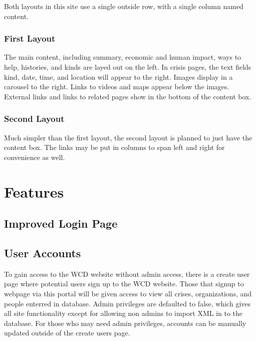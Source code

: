 \documentclass[12pt]{report}
\begin{document}
Both layouts in this site use a single outside row, with a single column named content.
\\


\subsubsection*{First Layout}
The main content, including summary, economic and human impact,
ways to help, histories, and kinds are layed out on the left.
In crisis pages, the text fields kind, date, time, and location will appear to the right.
Images display in a carousel to the right.
Links to videos and maps appear below the images.
External links and links to related pages show in the bottom of the content box.
\\


\subsubsection*{Second Layout}
Much simpler than the first layout, the second layout is planned to just have the content box.
The links may be put in columns to span left and right for convenience as well.
\\


\newpage
\section*{Features}
\hfill

\subsection*{Improved Login Page}
\hfill


\subsection*{User Accounts}
\hfill

To gain access to the WCD website without admin access, there is a create user page where potential users sign up to the WCD website. Those that signup to webpage via this portal will be given access to view all crises, organizations, and people enterred in database. Admin privileges are defaulted to false, which gives all site functionality except for allowing non admins to import XML in to the database. For those who may need admin privileges, accounts can be manually updated outside of the create users page.

\end{document}
